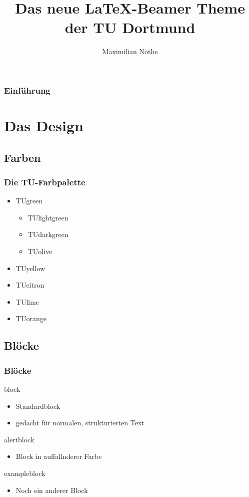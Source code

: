 \documentclass{beamer}
\title{Das neue \LaTeX-Beamer Theme der TU Dortmund}
\author{Maximilian Nöthe}
\institute[Lehrstuhl E5b \\ Fakultät Physik]{Lehrstuhl E5b \par\vspace{3pt} Fakultät Physik}
\begin{document}
\begin{frame}
\setcounter{framenumber}{0}
    \titlepage
\end{frame}

\begin{frame}
    \frametitle{Einführung}
    \tableofcontents[pausesections]
\end{frame}

\section{Das Design}
\subsection{Farben}
\begin{frame}
    \frametitle{Die TU-Farbpalette}
    \begin{itemize}
        \item \textcolor{TUgreen}{TUgreen}
            \begin{itemize}
                \item \textcolor{TUlightgreen}{TUlightgreen}
                \item \textcolor{TUdarkgreen}{TUdarkgreen}
                \item \textcolor{TUolive}{TUolive}
            \end{itemize}
        \item \textcolor{TUyellow}{TUyellow}
        \item \textcolor{TUcitron}{TUcitron}
        \item \textcolor{TUlime}{TUlime}
        \item \textcolor{TUorange}{TUorange}
    \end{itemize}
\end{frame}

\subsection{Blöcke}
\begin{frame}
    \frametitle{Blöcke}
    \begin{block}{block}
        \begin{itemize}
            \item Standardblock
            \item gedacht für normalen, strukturierten Text
        \end{itemize}
    \end{block}
    \begin{alertblock}{alertblock}
        \begin{itemize}
            \item Block in auffallnderer Farbe 
        \end{itemize}
    \end{alertblock}
    \begin{exampleblock}{exampleblock}
        \begin{itemize}
            \item Noch ein anderer Block
        \end{itemize}
    \end{exampleblock}
\end{frame}
\end{document}
